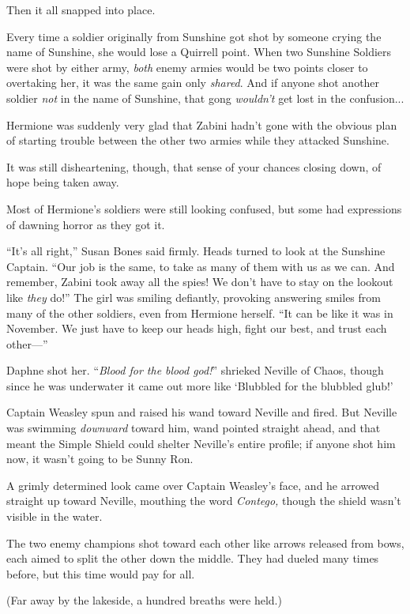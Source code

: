 Then it all snapped into place.

Every time a soldier originally from Sunshine got shot by someone crying the name of Sunshine, she would lose a Quirrell point. When two Sunshine Soldiers were shot by either army, \emph{both} enemy armies would be two points closer to overtaking her, it was the same gain only \emph{shared}. And if anyone shot another soldier \emph{not} in the name of Sunshine, that gong \emph{wouldn’t} get lost in the confusion...

Hermione was suddenly very glad that Zabini hadn’t gone with the obvious plan of starting trouble between the other two armies while they attacked Sunshine.

It was still disheartening, though, that sense of your chances closing down, of hope being taken away.

Most of Hermione’s soldiers were still looking confused, but some had expressions of dawning horror as they got it.

“It’s all right,” Susan Bones said firmly. Heads turned to look at the Sunshine Captain. “Our job is the same, to take as many of them with us as we can. And remember, Zabini took away all the spies! We don’t have to stay on the lookout like \emph{they} do!” The girl was smiling defiantly, provoking answering smiles from many of the other soldiers, even from Hermione herself. “It can be like it was in November. We just have to keep our heads high, fight our best, and trust each other—”

Daphne shot her.
\sbreak
“\emph{Blood for the blood god!}” shrieked Neville of Chaos, though since he was underwater it came out more like ‘Blubbled for the blubbled glub!’

Captain Weasley spun and raised his wand toward Neville and fired. But Neville was swimming \emph{downward} toward him, wand pointed straight ahead, and that meant the Simple Shield could shelter Neville’s entire profile; if anyone shot him now, it wasn’t going to be Sunny Ron.

A grimly determined look came over Captain Weasley’s face, and he arrowed straight up toward Neville, mouthing the word \emph{Contego,} though the shield wasn’t visible in the water.

The two enemy champions shot toward each other like arrows released from bows, each aimed to split the other down the middle. They had dueled many times before, but this time would pay for all.

(Far away by the lakeside, a hundred breaths were held.)

